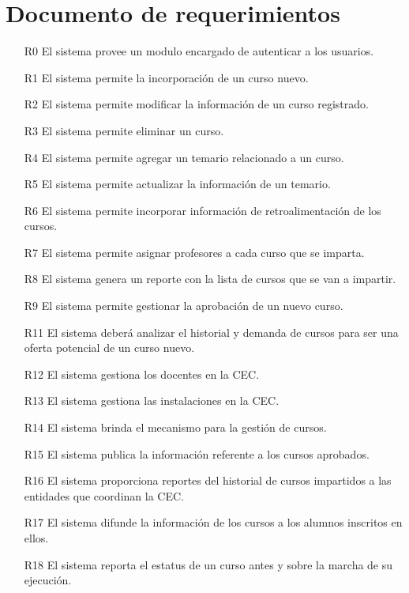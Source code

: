 \newpage
\section{Documento de requerimientos}

	\begin{itemize}
		\item[R0] El sistema provee un modulo encargado de autenticar a los usuarios.
		\item[R1] El sistema permite la incorporación de un curso nuevo.
		\item[R2] El sistema permite modificar la información de un curso registrado.
		\item[R3] El sistema permite eliminar un curso.
		\item[R4] El sistema permite agregar un temario relacionado a un curso.
		\item[R5] El sistema permite actualizar la información de un temario.
		\item[R6] El sistema permite incorporar información de retroalimentación de los cursos.
		\item[R7] El sistema permite asignar profesores a cada curso que se imparta.
		\item[R8] El sistema genera un reporte con la lista de cursos que se van a impartir.
		\item[R9] El sistema permite gestionar la aprobación de un nuevo curso.
		\item[R11] El sistema deberá analizar el historial y demanda de cursos para ser una oferta potencial de un curso nuevo.
		\item[R12] El sistema gestiona los docentes en la CEC.
		\item[R13] El sistema gestiona las instalaciones en la CEC.
		\item[R14] El sistema brinda el mecanismo para la gestión de cursos.
		\item[R15] El sistema publica la información referente a los cursos aprobados.
		\item[R16] El sistema proporciona reportes del historial de cursos impartidos a las entidades que coordinan la CEC.
		\item[R17] El sistema difunde la información de los cursos a los alumnos inscritos en ellos.
		\item[R18] El sistema reporta el estatus de un curso antes y sobre la marcha de su ejecución.
	\end{itemize}